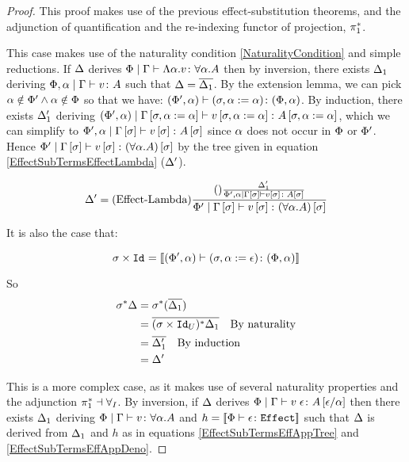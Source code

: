 \documentclass{Report}
\begin{document}
\begin{proof}
    This proof makes use of the previous effect-substitution theorems, and the adjunction of quantification and the re-indexing functor of projection, $\pstar$.


This case makes use of the naturality condition \ref{NaturalityCondition} and simple reductions. 
If $\D$ derives $\gpetyperelation{\elam{\a}{v}}{\all{\a}{A}}$ then by inversion, there exists $\D_1$ deriving  $\etyperelation{\P,\a}{\G}{v}{A}$ such that $\D = \bar{\D_1}$. By the extension lemma, we can pick $\a\notin\P'\wedge\a\notin\P$ so that we have: $\typerelation{(\P',\a)}{(\si, \a\setto\a)}{(\P,\a)}$. By induction, there exists $\D_1'$ deriving $\etyperelation{(\P', \a)}{\G\sub{\si, \a\setto\a}}{v\sub{\si,\a\setto\a}}{A\sub{\si, \a\setto\a}}$, which we can simplify to $\etyperelation{\P',\a}{\G\ssi}{v\ssi}{A\ssi}$ since $\a$ does not occur in $\P$ or $\P'$. Hence $\etyperelation{\P'}{\G\ssi}{v\ssi}{(\all{\a}{A})\ssi}$ by the tree given in equation \ref{EffectSubTermsEffectLambda} ($\D'$).

\begin{equation}\label{EffectSubTermsEffectLambda}
    \D' = \treerule{Effect-Lambda}{\treerule{}{\D_1'}{\etyperelation{\P',\a}{\G\ssi}{v\ssi}{A\ssi}}}{\etyperelation{\P'}{\G\ssi}{v\ssi}{(\all{\a}{A})\ssi}}
\end{equation}

It is also the case that:

\begin{equation}
    \si\times\Id{} = \deno{\typerelation{(\P',\a)}{(\si, \a\setto\e)}{(\P,\a)}}
\end{equation}

So
\begin{align}
    \si\star\D &= \si\star(\bar{\D_1})\\
    & = \bar{(\si\times\Id{U})\star\D_1}\qt{By naturality}\\
    & = \bar{\D_1'}\qt{By induction}\\
    & = \D'
\end{align}


This is a more complex case, as it makes use of several naturality properties and the adjunction $\pstar\dashv\allI$. By inversion, if $\D$ derives $\gpetyperelation{\eapp{v}{\e}}{A\ssub{\a}{\e}}$ then there exists $\D_1$ deriving $\gpetyperelation{v}{\all{\a}{A}}$ and $h = \deno{\typerelation{\P}{\e}{\effect}}$ such that $\D$ is derived from $\D_1$ and $h$ as in equations \ref{EffectSubTermsEffAppTree} and \ref{EffectSubTermsEffAppDeno}.



\end{proof}
\end{document}
